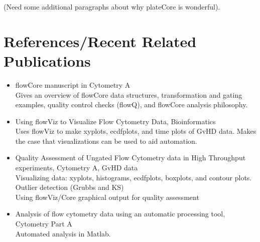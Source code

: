 \documentclass[12pt]{article}
\begin{document}
(Need some additional paragraphs about why plateCore is wonderful).

\section{References/Recent Related Publications}
\begin{itemize}
\item flowCore manuscript in Cytometry A\\
Gives an overview of flowCore data structures, transformation and gating examples, quality control checks (flowQ), and 
flowCore analysis philosophy.\\
\item Using flowViz to Visualize Flow Cytometry Data, Bioinformatics\\
Uses flowViz to make xyplots, ecdfplots, and time plots of GvHD data. Makes the case that visualizations can be used to aid automation.
\item Quality Assessment of Ungated Flow Cytometry data in High Throughput experiments, Cytometry A, GvHD data\\
Visualizing data: xyplots, histograms, ecdfplots, boxplots, and contour plots.\\
Outlier detection (Grubbs and KS)\\
Using flowViz/Core graphical output for quality assessment\\
\item Analysis of flow cytometry data using an automatic processing tool, Cytometry Part A\\
Automated analysis in Matlab.\\
\end{itemize}
\end{document}
